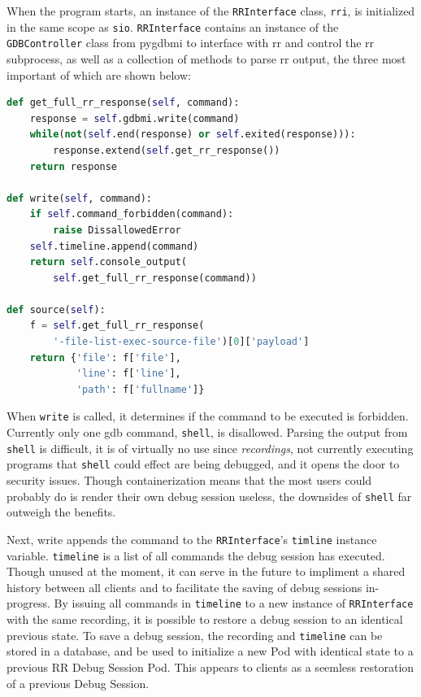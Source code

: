 \documentclass[12pt]{article}
\begin{document}
When the program starts, an instance of the \lstinline{RRInterface}
class, \lstinline{rri}, is initialized in the same scope as
\lstinline{sio}.  \lstinline{RRInterface} contains an instance of the
\lstinline{GDBController} class from pygdbmi to interface with rr and
control the rr subprocess, as well as a collection of methods to parse
rr output, the three most important of which are shown below: \\

\begin{lstlisting}[language=Python,basicstyle=\linespread{0.5}\ttfamily\small,caption={RRInterface},captionpos=b]
def get_full_rr_response(self, command):
    response = self.gdbmi.write(command)
    while(not(self.end(response) or self.exited(response))):
        response.extend(self.get_rr_response())
    return response

def write(self, command):
    if self.command_forbidden(command):
        raise DissallowedError
    self.timeline.append(command)
    return self.console_output(
        self.get_full_rr_response(command))

def source(self):
    f = self.get_full_rr_response(
        '-file-list-exec-source-file')[0]['payload']
    return {'file': f['file'],
            'line': f['line'],
            'path': f['fullname']}
\end{lstlisting}

When \lstinline{write} is called, it determines if the command to be
executed is forbidden.  Currently only one gdb command,
\lstinline{shell}, is disallowed.  Parsing the output from
\lstinline{shell} is difficult, it is of virtually no use since
\textit{recordings}, not currently executing programs that
\lstinline{shell} could effect are being debugged, and it opens the
door to security issues.  Though containerization means that the most
users could probably do is render their own debug session useless, the
downsides of \lstinline{shell} far outweigh the benefits.
\par

Next, write appends the command to the \lstinline{RRInterface}'s
\lstinline{timline} instance variable.  \lstinline{timeline} is a list
of all commands the debug session has executed.  Though unused at the
moment, it can serve in the future to impliment a shared history
between all clients and to facilitate the saving of debug sessions
in-progress.  By issuing all commands in \lstinline{timeline} to a new
instance of \lstinline{RRInterface} with the same recording, it is
possible to restore a debug session to an identical previous state.
To save a debug session, the recording and \lstinline{timeline} can be
stored in a database, and be used to initialize a new Pod with
identical state to a previous RR Debug Session Pod.  This appears to
clients as a seemless restoration of a previous Debug Session.
\par
\end{document}
